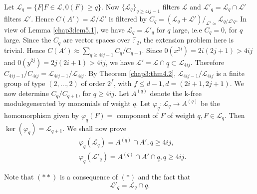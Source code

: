     Let $\mathscr{L}_q = \big\{F \big | F \in \mathscr{L}, 0(F) \ge q
    \big \}$. Now $\big \{\mathscr{L}_q \big\}_{q \ge 4ij - 1}$
    filters $\mathscr{L}$ and $\mathscr{L}'_q = \mathscr{L}_q \cap
    \mathscr{L}'$ filters $\mathscr{L}'$. Hence $C(A') = \mathscr{L}/
    \mathscr{L}'$ is filtered by $C_q = (\mathscr{L}_q +
    \mathscr{L}')/_{\mathscr{L}' \approx} \mathscr{L}_{q/ \mathscr{L}'
      q}$. In view of Lemma \ref{chap3:lem5.1}, we have $\mathscr{L}_q
    =     \mathscr{L}' _q$ for $q$ large, ie.e $C_q = 0$, for $q$ 
    large. Since the $C_q$ are vector spaces over $\mathbb{F}_2$, the
    extension problem here is trivial. Hence $C(A') \approx
    \sum\limits_{q \ge 4ij -1} C_q / C_{q+1}$. Since $0 (x^{2i}) = 2i
    (2j +1) > 4ij$ and $0(y^{2j}) = 2j (2i +1) > 4ij$, we have
    $\mathscr{L}' = \mathscr{L} \cap \underline{q} \subset
    \mathscr{L}_{4ij}$. Therefore $C_{4ij - 1}\big / C_{4ij}=
    \mathscr{L}_{4 ij - 1}\big / \mathscr{L}_{4ij}$. By Theorem
    \ref{chap3:thm4.2},
    $\mathscr{L}_{4ij -1} \big / \mathscr{L}_{4ij}$ is a finite group
    of type $(2, \ldots , 2) $ of order $2^f$, with $f\le d - 1, d =
    (2 i +1, 2 j +1)$. We now determine $C_q \big / C_{q+1}$, for $q
    \ge 4ij$. Let $A^{(q)}$ denote the k-free module\pageoriginale generated by
    monomials of weight $q$. Let $\varphi_q : \mathscr{L}_q \to
    A^{(q)}$ be the homomorphism given by $\varphi_q (F) = $ component
    of $F$ of weight $q, F \in \mathscr{L}_q$. Then $\ker (\varphi_q)
    = \mathscr{L}_{q+1}$. We shall now prove 
        \begin{align*}
& \varphi_q (\mathscr{L}_q) = A^{(q)} \cap A', q \ge 4ij, \tag{*}\\ 
& \varphi_q (\mathscr{L}'_q) = A^{(q)} \cap A' \cap \underline{q}, q
          \ge 4ij.\tag{**} 
    \end{align*}    
    
    \noindent
    Note that $(**)$ is a consequence of $(*)$ and the fact that 
    $$
    \mathscr{L}'_q = \mathscr{L}_q \cap \underline{q}.
    $$


